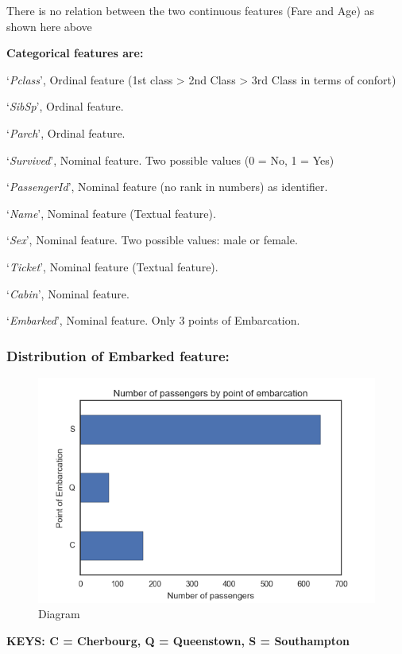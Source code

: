 \documentclass[11pt]{article}
\makeatletter
\def\maxwidth{\ifdim\Gin@nat@width>\linewidth\linewidth
    \else\Gin@nat@width\fi}
\let\Oldincludegraphics\includegraphics
\renewcommand{\includegraphics}[1]{\Oldincludegraphics[width=.8\maxwidth]{#1}}
\makeatother
\begin{document}
    There is no relation between the two continuous features (Fare and Age)
as shown here above

    \textbf{Categorical features are:}

`\emph{Pclass}', Ordinal feature (1st class \textgreater{} 2nd Class
\textgreater{} 3rd Class in terms of confort)

`\emph{SibSp}', Ordinal feature.

`\emph{Parch}', Ordinal feature.

`\emph{Survived}', Nominal feature. Two possible values (0 = No, 1 =
Yes)

`\emph{PassengerId}', Nominal feature (no rank in numbers) as
identifier.

`\emph{Name}', Nominal feature (Textual feature).

`\emph{Sex}', Nominal feature. Two possible values: male or female.

`\emph{Ticket}', Nominal feature (Textual feature).

`\emph{Cabin}', Nominal feature.

`\emph{Embarked}', Nominal feature. Only 3 points of Embarcation.

    \subsubsection{Distribution of Embarked
feature:}\label{distribution-of-embarked-feature}

    \begin{figure}
\centering
\includegraphics{NbPassengersByEmbarcationPt.png}
\caption{Diagram}
\end{figure}

\textbf{KEYS: C = Cherbourg, Q = Queenstown, S = Southampton}
\end{document}
